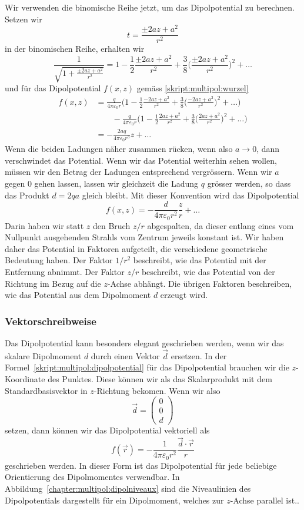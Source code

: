Wir verwenden die binomische Reihe jetzt, um das Dipolpotential
zu berechnen.
Setzen wir 
\[
t=\frac{\pm 2az+a^2}{r^2}
\]
in der binomischen Reihe, erhalten wir
\[
\frac{1}{\sqrt{1+\frac{\pm 2az+a^2}{r^2}}}
=
1-\frac12\frac{\pm 2az+a^2}{r^2}
+
\frac38 \biggl(\frac{\pm 2az+a^2}{r^2}\biggr)^2+\dots
\]
und für das Dipolpotential $f(x,z)$ gemäss \eqref{skript:multipol:wurzel}
\begin{align*}
f(x,z)
&=
\frac{q}{4\pi\varepsilon_0 r}
\biggl(
1-\frac12\frac{-2az+a^2}{r^2} + \frac38 \biggl(\frac{-2az+a^2}{r^2}\biggr)^2+\dots
\biggr)
\\
&\qquad
-
\frac{q}{4\pi\varepsilon_0 r}
\biggl(
1-\frac12\frac{2az+a^2}{r^2} + \frac38 \biggl(\frac{2az+a^2}{r^2}\biggr)^2+\dots
\biggr)
\\
&=
-\frac{2aq}{4\pi\varepsilon_0r^3}z + \dots
\end{align*}
Wenn die beiden Ladungen näher zusammen rücken, wenn also $a\to 0$,
dann verschwindet das Potential.
Wenn wir das Potential weiterhin sehen wollen, müssen wir den Betrag
der Ladungen entsprechend vergrössern.
Wenn wir $a$ gegen $0$ gehen lassen, lassen wir gleichzeit die Ladung
$q$ grösser werden, so dass das Produkt $d=2qa$ gleich bleibt.
Mit dieser Konvention wird das Dipolpotential
\begin{equation}
f(x,z) = -\frac{d}{4\pi\varepsilon_0 r^2}\frac{z}{r}+\dots
\label{skript:multipol:dipolpotential}
\end{equation}
Darin haben wir statt $z$ den Bruch $z/r$ abgespalten, da dieser
entlang eines vom Nullpunkt ausgehenden Strahls vom Zentrum jeweils
konstant ist.
Wir haben daher das Potential in Faktoren aufgeteilt, die verschiedene
geometrische Bedeutung haben.
Der Faktor $1/r^2$ beschreibt, wie das Potential mit der Entfernung abnimmt.
Der Faktor $z/r$ beschreibt, wie das Potential von der Richtung im
Bezug auf die $z$-Achse abhängt.
Die übrigen Faktoren beschreiben, wie das Potential aus dem Dipolmoment
$d$ erzeugt wird.

\subsubsection{Vektorschreibweise}
Das Dipolpotential kann besonders elegant geschrieben werden, wenn
wir das skalare Dipolmoment $d$ durch einen Vektor $\vec{d}$ ersetzen.
In der Formel~\eqref{skript:multipol:dipolpotential}
für das Dipolpotential brauchen wir die $z$-Koordinate
des Punktes.
Diese können wir als das Skalarprodukt mit dem Standardbasisvektor
in $z$-Richtung bekomen.
Wenn wir also
\[
\vec{d}=\begin{pmatrix}0\\0\\d\end{pmatrix}
\]
setzen, dann können wir das Dipolpotential vektoriell als
\begin{equation*}
f(\vec{r})
=
-
\frac{1}{4\pi\varepsilon_0r^2} \frac{\vec{d}\cdot\vec{r}}{r}
\end{equation*}
geschrieben werden.
In dieser Form ist das Dipolpotential für jede beliebige Orientierung
des Dipolmomentes verwendbar.
In Abbildung~\ref{chapter:multipol:dipolniveaux} sind die Niveaulinien
des Dipolpotentials dargestellt für ein Dipolmoment, welches zur
$z$-Achse parallel ist..

